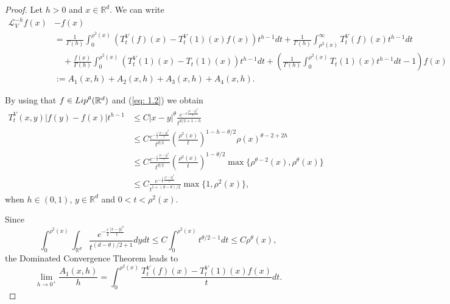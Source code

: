 \documentclass[10pt,a4paper]{amsart}
\newcommand{\Lip}{\textup{Lip}}
\newcommand{\RR}{\mathbb{R}}
\begin{document}
\begin{proof}Let $h>0$ and $x\in \RR^d$. We can write
\begin{align*}
    \mathcal{L}^{-h}_Vf(x)&-f(x)\\
    &=\frac{1}{\Gamma(h)}\int_0^{\rho^2(x)}\left(T_t^V(f)(x)-T_t^V(1)(x)f(x)\right)t^{h-1} dt+\frac{1}{\Gamma(h)}\int_{\rho^2(x)}^\infty T_t^V(f)(x)t^{h-1} dt\\
    &\quad +\frac{f(x)}{\Gamma(h)}\int_0^{\rho^2(x)} \left(T_t^V(1)(x)-T_t(1)(x)\right)t^{h-1}dt+\left(\frac{1}{\Gamma(h)}\int_0^{\rho^2(x)} T_t(1)(x)t^{h-1} dt-1\right)f(x)\\
    &:=A_1(x,h)+A_2(x,h)+A_3(x,h)+A_4(x,h).
\end{align*}

By using that $f\in \Lip^\theta(\RR^d)$ and (\ref{eq: 1.2}) we obtain
\begin{align*}
 T_t^V(x,y)|f(y)-f(x)|t^{h-1}&\le C|x-y|^\theta\frac{e^{-c\frac{|x-y|^2}{t}}}{t^{d/2+1-h}}\\
 &\le C\frac{e^{-\frac c2\frac{|x-y|^2}{t}}}{t^{d/2}}\left(\frac{\rho^2(x)}{t}\right)^{1-h-\theta/2}\rho(x)^{\theta-2+2h}\\
 &\le C\frac{e^{-\frac c2\frac{|x-y|^2}{t}}}{t^{d/2}}\left(\frac{\rho^2(x)}{t}\right)^{1-\theta/2}\max\{\rho^{\theta-2}(x),\rho^{\theta}(x)\}\\
 &\le C\frac{e^{-\frac c2\frac{|x-y|^2}{t}}}{t^{1+(d-\theta)/2}}\max\{1,\rho^2(x)\},
    \end{align*}
when $h\in (0,1)$, $y\in\mathbb{R}^d$ and $0<t<\rho^2(x)$.

Since 
\[
\int_0^{\rho^2(x)}\int_{\mathbb{R}^d}\frac{e^{-\frac c2\frac{|x-y|^2}{t}}}{t^{(d-\theta)/2+1}}dydt\le C\int_0^{\rho^2(x)}t^{\theta/2-1}dt\le C\rho^\theta(x),
\]
the Dominated Convergence Theorem leads to
\[
\lim_{h\to 0^+}\frac{A_1(x,h)}{h}=\int_0^{\rho^2(x)}\frac{T_t^V(f)(x)-T_t^V(1)(x)f(x)}{t}dt.
\]



\end{proof}
\end{document}
